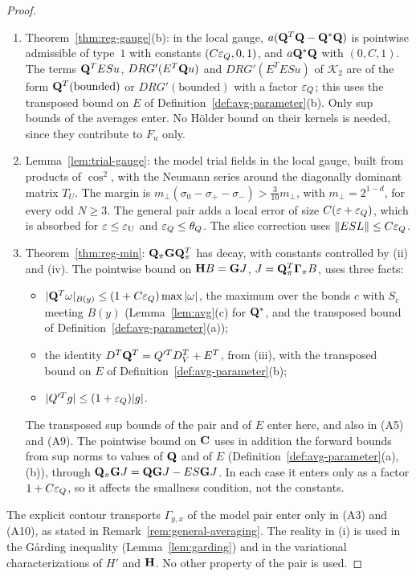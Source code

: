 \begin{proof}
\begin{enumerate}[label=(A\arabic*)]
\item Theorem~\ref{thm:reg-gauge}(b): in the local gauge, $a(\mathbf Q^T\mathbf Q-\mathbf Q^*\mathbf Q)$ is pointwise admissible of type~$1$ with constants $(C\varepsilon_Q,0,1)$, and $a\mathbf Q^*\mathbf Q$ with $(0,C,1)$. The terms $\mathbf Q^TESu$, $DRG'(E^T\mathbf Q u)$ and $DRG'(E^TESu)$ of $\mathcal K_2$ are of the form $\mathbf Q^T(\text{bounded})$ or $DRG'(\text{bounded})$ with a factor $\varepsilon_Q$; this uses the transposed bound on $E$ of Definition~\ref{def:avg-parameter}(b). Only sup bounds of the averages enter. No H\"older bound on their kernels is needed, since they contribute to $F_u$ only.
\item Lemma~\ref{lem:trial-gauge}: the model trial fields in the local gauge, built from products of $\cos^2$, with the Neumann series around the diagonally dominant matrix $T_U$. The margin is $m_\perp(\sigma_0-\sigma_+-\sigma_-)>\frac3{10}m_\perp$, with $m_\perp=2^{1-d}$, for every odd $N\ge3$. The general pair adds a local error of size $C(\varepsilon+\varepsilon_Q)$, which is absorbed for $\varepsilon\le\varepsilon_{\rm U}$ and $\varepsilon_Q\le\theta_Q$. The slice correction uses $\|ESL\|\le C\varepsilon_Q$.
\item Theorem~\ref{thm:reg-min}: $\mathbf Q_\pi\mathbf G\mathbf Q_\pi^T$ has decay, with constants controlled by (ii) and (iv). The pointwise bound on $\mathbf H B=\mathbf G J$, $J=\mathbf Q_\pi^T\boldsymbol\Gamma_\pi B$, uses three facts:
  \begin{itemize}
  \item $|\mathbf Q^T\omega|_{B(y)}\le(1+C\varepsilon_Q)\max|\omega|$, the maximum over the bonds $c$ with $S_c$ meeting $B(y)$ (Lemma~\ref{lem:avg}(c) for $\mathbf Q^*$, and the transposed bound of Definition~\ref{def:avg-parameter}(a));
  \item the identity $D^T\mathbf Q^T=Q'^TD_V^T+E^T$, from (iii), with the transposed bound on $E$ of Definition~\ref{def:avg-parameter}(b);
  \item $|Q'^Tg|\le(1+\varepsilon_Q)|g|$.
  \end{itemize}
  The transposed sup bounds of the pair and of $E$ enter here, and also in (A5) and (A9). The pointwise bound on $\mathbf C$ uses in addition the forward bounds from sup norms to values of $\mathbf Q$ and of $E$ (Definition~\ref{def:avg-parameter}(a),(b)), through $\mathbf Q_\pi\mathbf G J=\mathbf Q\mathbf G J-ES\mathbf G J$. In each case it enters only as a factor $1+C\varepsilon_Q$, so it affects the smallness condition, not the constants.
\end{enumerate}
The explicit contour transports $\Gamma_{y,x}$ of the model pair enter only in (A3) and (A10), as stated in Remark~\ref{rem:general-averaging}. The reality in (i) is used in the G\aa rding inequality (Lemma~\ref{lem:garding}) and in the variational characterizations of $H'$ and $\mathbf H$. No other property of the pair is used.


\end{proof}
